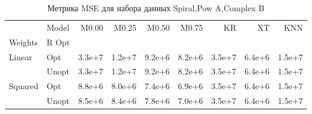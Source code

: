 \begin{table}
\caption{Метрика MSE для набора данных Spiral,Pow A,Complex B}
\label{tab:MSE_Spiral,Pow A,Complex B}
\begin{tabular}{llrrrrrrr}
\toprule
 & Model & M0.00 & M0.25 & M0.50 & M0.75 & KR & XT & KNN \\
Weights & R Opt &  &  &  &  &  &  &  \\
\midrule
\multirow[t]{2}{*}{Linear} & Opt & 3.3e+7 & 1.2e+7 & 9.2e+6 & 8.2e+6 & 3.5e+7 & 6.4e+6 & 1.5e+7 \\
 & Unopt & 3.3e+7 & 1.2e+7 & 9.2e+6 & 8.2e+6 & 3.5e+7 & 6.4e+6 & 1.5e+7 \\

\multirow[t]{2}{*}{Squared} & Opt & 8.8e+6 & 8.0e+6 & 7.4e+6 & 6.9e+6 & 3.5e+7 & 6.4e+6 & 1.5e+7 \\
 & Unopt & 8.5e+6 & 8.4e+6 & 7.8e+6 & 7.0e+6 & 3.5e+7 & 6.4e+6 & 1.5e+7 \\

\bottomrule
\end{tabular}
\end{table}
